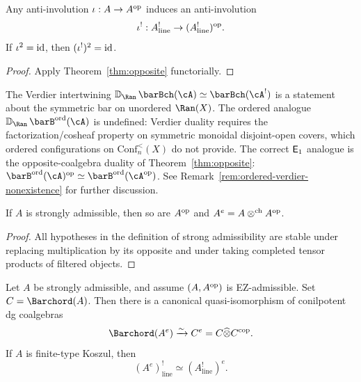 \begin{corollary}
\ClaimStatusProvedHere
\label{cor:anti}
Any anti-involution $\iota:A\to A^{\mathrm{op}}$ induces an anti-involution
\[
\iota^!:A^!_{\mathrm{line}}\to (A^!_{\mathrm{line}})^{\mathrm{op}}.
\]
If $\iota^2=\mathrm{id}$, then $(\iota^!)^2=\mathrm{id}$.
\end{corollary}

\begin{proof}
Apply Theorem~\ref{thm:opposite} functorially.
\end{proof}

\begin{remark}
\label{rem:app-ordered-verdier-nonexistence}
The Verdier intertwining
$\mathbb{D}_{\Ran}\,\barBch(\cA) \simeq \barBch(\cA^!)$
is a statement about the symmetric bar on unordered $\Ran(X)$.
The ordered analogue $\mathbb{D}_{\Ran}\,\barB^{\mathrm{ord}}(\cA)$
is undefined: Verdier duality requires the factorization/cosheaf
property on symmetric monoidal disjoint-open covers, which ordered
configurations on $\mathrm{Conf}^<_n(X)$ do not provide.
The correct $\mathsf{E}_1$ analogue is the opposite-coalgebra duality of
Theorem~\ref{thm:opposite}:
$\barB^{\mathrm{ord}}(\cA)^{\mathrm{op}} \simeq
\barB^{\mathrm{ord}}(\cA^{\mathrm{op}})$.
See Remark~\ref{rem:ordered-verdier-nonexistence} for further
discussion.
\end{remark}

\begin{lemma}
\ClaimStatusProvedHere
\label{lem:closure}
If $A$ is strongly admissible, then so are $A^{\mathrm{op}}$ and $A^e=A\mathbin{\otimes^{\mathrm{ch}}} A^{\mathrm{op}}$.
\end{lemma}

\begin{proof}
All hypotheses in the definition of strong admissibility are stable under replacing multiplication by
its opposite and under taking completed tensor products of filtered objects.
\end{proof}

\begin{corollary}
\ClaimStatusProvedHere
\label{cor:enveloping}
Let $A$ be strongly admissible, and assume $(A,A^{\mathrm{op}})$ is EZ-admissible. Set $C=\Barchord(A)$.
Then there is a canonical quasi-isomorphism of conilpotent dg coalgebras
\[
\Barchord(A^e)\xrightarrow{\sim} C^e=C\widehat\otimes C^{\cop}.
\]
If $A$ is finite-type Koszul, then
\[
(A^e)^!_{\mathrm{line}}\simeq (A^!_{\mathrm{line}})^e.
\]
\end{corollary}

